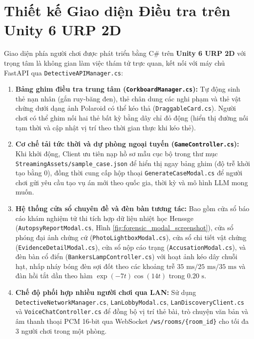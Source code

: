 \section{Thiết kế Giao diện Điều tra trên Unity 6 URP 2D}
\label{sec:arch_unity_ui}

Giao diện phía người chơi được phát triển bằng C\# trên \textbf{Unity 6 URP 2D} với trọng tâm là không gian làm việc thám tử trực quan, kết nối với máy chủ FastAPI qua \texttt{DetectiveAPIManager.cs}:

\begin{enumerate}[leftmargin=1.5cm]
    \item \textbf{Bảng ghim điều tra trung tâm (\texttt{CorkboardManager.cs}):} Tự động sinh thẻ nạn nhân (gắn ruy-băng đen), thẻ chân dung các nghi phạm và thẻ vật chứng dưới dạng ảnh Polaroid có thể kéo thả (\texttt{DraggableCard.cs}). Người chơi có thể ghim nối hai thẻ bất kỳ bằng dây chỉ đỏ động (hiển thị đường nối tạm thời và cập nhật vị trí theo thời gian thực khi kéo thẻ).
    \item \textbf{Cơ chế tải tức thời và dự phòng ngoại tuyến (\texttt{GameController.cs}):} Khi khởi động, Client ưu tiên nạp hồ sơ mẫu cục bộ trong thư mục \texttt{StreamingAssets/sample\_case.json} để hiển thị ngay bảng ghim (độ trễ khởi tạo bằng 0), đồng thời cung cấp hộp thoại \texttt{GenerateCaseModal.cs} để người chơi gửi yêu cầu tạo vụ án mới theo quốc gia, thời kỳ và mô hình LLM mong muốn.
    \item \textbf{Hệ thống cửa sổ chuyên đề và đèn bàn tương tác:} Bao gồm cửa sổ báo cáo khám nghiệm tử thi tích hợp dữ liệu nhiệt học Henssge (\texttt{AutopsyReportModal.cs}, Hình \ref{fig:forensic_modal_screenshot}), cửa sổ phóng đại ảnh chứng cứ (\texttt{PhotoLightboxModal.cs}), cửa sổ chi tiết vật chứng (\texttt{EvidenceDetailModal.cs}), cửa sổ nộp cáo trạng (\texttt{AccusationModal.cs}), và đèn bàn cổ điển (\texttt{BankersLampController.cs}) với hoạt ảnh kéo dây chuỗi hạt, nhấp nháy bóng đèn sợi đốt theo các khoảng trễ $35\text{ ms} / 25\text{ ms} / 35\text{ ms}$ và đàn hồi tắt dần theo hàm $\exp(-7t)\cos(14t)$ trong $0.20\text{ s}$.
    \item \textbf{Chế độ phối hợp nhiều người chơi qua LAN:} Sử dụng \texttt{DetectiveNetworkManager.cs}, \texttt{LanLobbyModal.cs}, \texttt{LanDiscoveryClient.cs} và \texttt{VoiceChatController.cs} để đồng bộ vị trí thẻ bài, trò chuyện văn bản và âm thanh thoại PCM 16-bit qua WebSocket \texttt{/ws/rooms/\{room\_id\}} cho tối đa 3 người chơi trong một phòng.
\end{enumerate}

